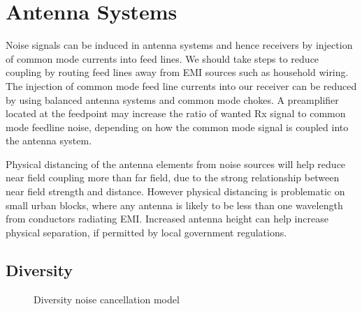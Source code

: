 \documentclass{article}
\begin{document}
\section{Antenna Systems}

Noise signals can be induced in antenna systems and hence receivers by injection of common mode currents into feed lines. We should take steps to reduce coupling by routing feed lines away from EMI sources such as household wiring.  The injection of common mode feed line currents into our receiver can be reduced by using balanced antenna systems and common mode chokes. A preamplifier located at the feedpoint may increase the ratio of wanted Rx signal to common mode feedline noise, depending on how the common mode signal is coupled into the antenna system. 

Physical distancing of the antenna elements from noise sources will help reduce near field coupling more than far field, due to the strong relationship between near field strength and distance.  However physical distancing is problematic on small urban blocks, where any antenna is likely to be less than one wavelength from conductors radiating EMI.  Increased antenna height can help increase physical separation, if permitted by local government regulations.

\subsection{Diversity}

\begin{figure}[h]
\caption{Diversity noise cancellation model}
\label{fig:diveristy_model}
\begin{center}
\end{center}
\end{figure}
\end{document}
